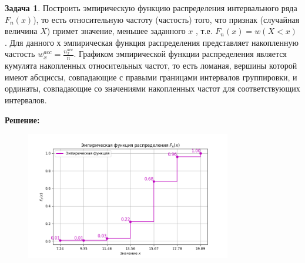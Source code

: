 \documentclass[a4paper,12pt]{article}
\theoremstyle{definition}
\newtheorem{problem}{Задача}\setlength{\parindent}{0pt}
\newenvironment{solution}
{\begin{shaded}\textbf{Решение:}\par\setlength{\parindent}{0pt}}
{\end{shaded}}
\newenvironment{answer}
{\par\noindent\textbf{Ответ:} }
{\par}
\begin{document}
\vspace{8pt}
\begin{problem}
    Построить эмпирическую функцию распределения интервального ряда \(F_n(x)\)), то
    есть относительную частоту (частость) того, что признак (случайная величина \(X\)) 
    примет значение, меньшее заданного \(x\) , т.е. \(F_n(x) = w(X < x)\) . 
    Для данного \(х\) эмпирическая функция распределения представляет 
    накопленную частость \(w^{acc}_x = \frac{n^{acc}_x}{n}\).
    Графиком эмпирической функции распределения является кумулята накопленных
    относительных частот, то есть ломаная, вершины которой имеют абсциссы,
    совпадающие с правыми границами интервалов группировки, и ординаты,
    совпадающие со значениями накопленных частот для соответствующих
    интервалов.
    
        \begin{solution}
            \begin{figure}[H]
                \centering
                \includegraphics[width=0.8\textwidth]{plots/task5plot.png}  
            \end{figure}
        \end{solution}
    
    
    \end{problem}
\end{document}
